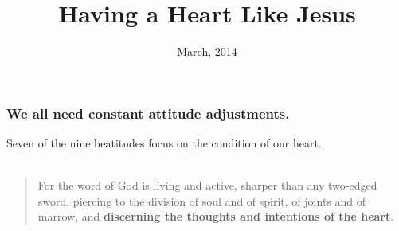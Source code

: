 \documentclass{beamer}
\title{Having a Heart Like Jesus}
\date{March, 2014}
\begin{document}
\frame{\titlepage}


\begin{frame}
\frametitle{We all need constant attitude adjustments.}
Seven of the nine beatitudes focus on the condition of our heart.\\~\\
\begin{quote}
For the word of God is living and active, sharper than any two-edged sword, piercing to the division of soul and of spirit, of joints and of marrow, and \textbf{discerning the thoughts and intentions of the heart}.

\end{quote}


\end{frame}




\end{document}
